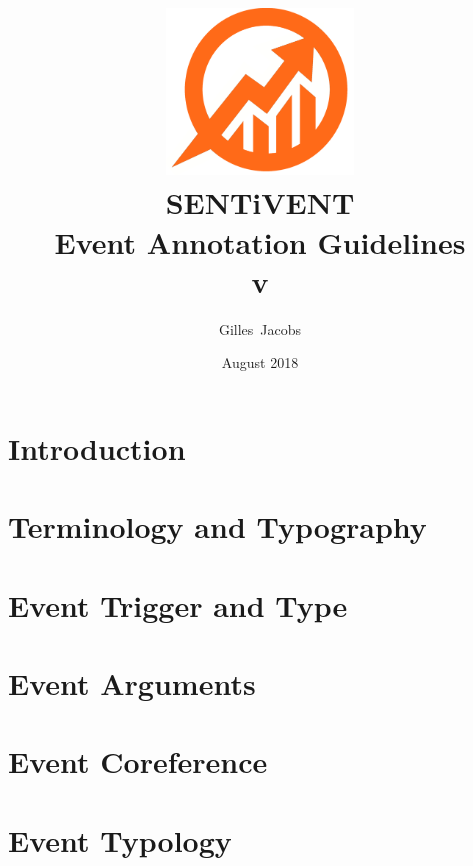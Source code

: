 \documentclass[a4paper]{report}
\title{
    \includegraphics[width=5cm]{img/semalyticslogonotext.png}\\
    [10pt]{\huge\bfseries {\Huge S{\huge ENT}i{\huge VENT}}\\
    Event Annotation Guidelines\\
    v\vhCurrentVersion\\
    \Large{\normalfont{Technical Report}}
    }
}
\author{Gilles~Jacobs}
\date{August 2018}
\begin{document}
\maketitle
\tableofcontents
\newpage


\label{chapter/rev}

\chapter{Introduction}
\label{chapter/intro}


\chapter{Terminology and Typography}
\label{chapter/conventions}


\chapter{Event Trigger and Type}
\label{chapter/events}


\chapter{Event Arguments}
\label{chapter/arguments}


\chapter{Event Coreference}
\label{chapter/coref}


\chapter{Event Typology}
\label{chapter/eventtype}



\nocite{*}
\printbibliography[heading=bibintoc]
\end{document}
